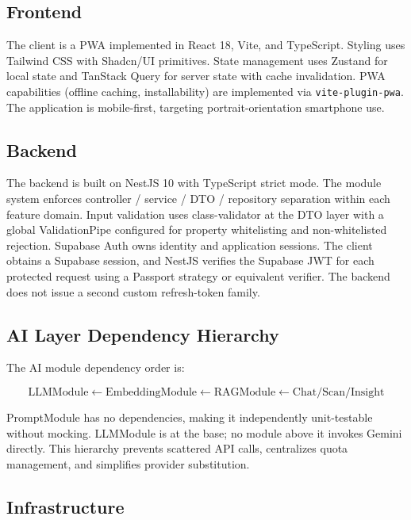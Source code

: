 \documentclass[conference]{IEEEtran}
\begin{document}
\subsection{Frontend}

The client is a PWA implemented in React 18, Vite, and TypeScript. Styling uses Tailwind CSS with Shadcn/UI primitives. State management uses Zustand for local state and TanStack Query for server state with cache invalidation. PWA capabilities (offline caching, installability) are implemented via \texttt{vite-plugin-pwa}. The application is mobile-first, targeting portrait-orientation smartphone use.

\subsection{Backend}

The backend is built on NestJS 10 with TypeScript strict mode. The module system enforces controller / service / DTO / repository separation within each feature domain. Input validation uses class-validator at the DTO layer with a global ValidationPipe configured for property whitelisting and non-whitelisted rejection. Supabase Auth owns identity and application sessions. The client obtains a Supabase session, and NestJS verifies the Supabase JWT for each protected request using a Passport strategy or equivalent verifier. The backend does not issue a second custom refresh-token family.

\subsection{AI Layer Dependency Hierarchy}

The AI module dependency order is:

\begin{equation}
\text{LLMModule} \leftarrow \text{EmbeddingModule} \leftarrow \text{RAGModule} \leftarrow \text{Chat/Scan/Insight}
\end{equation}

PromptModule has no dependencies, making it independently unit-testable without mocking. LLMModule is at the base; no module above it invokes Gemini directly. This hierarchy prevents scattered API calls, centralizes quota management, and simplifies provider substitution.

\subsection{Infrastructure}
\end{document}

